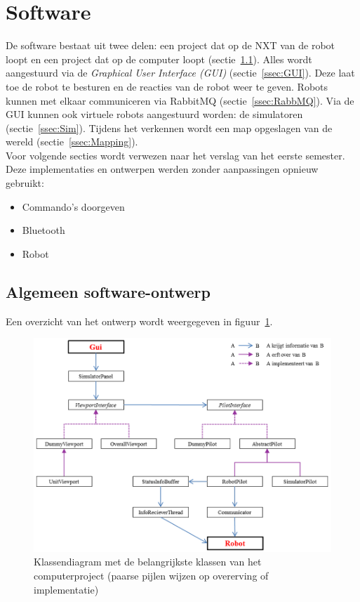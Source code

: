 \documentclass[tt3]{penoverslag}
\begin{document}
\section{Software}
\label{sec:Softw}
De software bestaat uit twee delen: een project dat op de NXT van de robot loopt en een project dat op de computer loopt (sectie~\ref{ssec:Sdesign}). Alles wordt aangestuurd via de \textit{Graphical User Interface (GUI)} (sectie~\ref{ssec:GUI}). Deze laat toe de robot te besturen en de reacties van de robot weer te geven. Robots kunnen met elkaar communiceren via RabbitMQ (sectie~\ref{ssec:RabbMQ}). Via de GUI kunnen ook virtuele robots aangestuurd worden: de simulatoren (sectie~\ref{ssec:Sim}). Tijdens het verkennen wordt een map opgeslagen van de wereld (sectie~\ref{ssec:Mapping}).\\

Voor volgende secties wordt verwezen naar het verslag van het eerste semester. Deze implementaties en ontwerpen werden zonder aanpassingen opnieuw gebruikt:

\begin{itemize}
\item Commando's doorgeven
\item Bluetooth
\item Robot
\end{itemize}

\subsection{Algemeen software-ontwerp}
\label{ssec:Sdesign}
Een overzicht van het ontwerp wordt weergegeven in figuur~\ref{fig:klasSoft}.\\

\begin{figure}
\centering
		\includegraphics[width=\textwidth]{KlasSoftware}
\caption[Klassendiagram computerproject]{Klassendiagram met de belangrijkste klassen van het computerproject (paarse pijlen wijzen op overerving of implementatie)}
\label{fig:klasSoft}
\end{figure}
\end{document}
